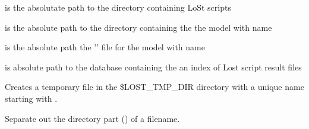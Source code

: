\begin{description}
 is the absolutate path to the directory containing LoSt scripts


 is the absolute path to the directory containing the the model with name 

 is the absolute path the '' file for the model with name 

 is absolute path to the database containing the an index of Lost script result files

Creates a temporary file in the \$LOST_TMP_DIR directory with a unique name starting with .

Separate out the directory part () of a filename.
\end{description}

